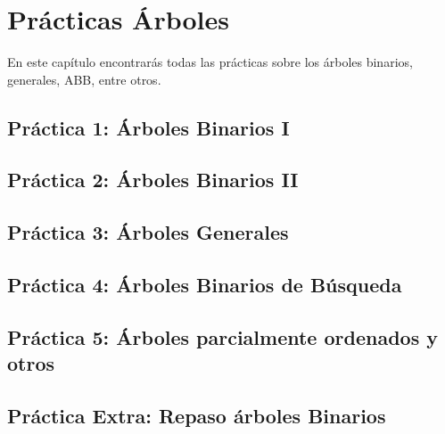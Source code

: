 \chapter{Prácticas Árboles}
En este capítulo encontrarás todas las prácticas sobre los árboles binarios, generales, ABB, entre otros.

\section*{Práctica 1: Árboles Binarios I}
{}
\label{sec:practica1}



\newpage
\section*{Práctica 2: Árboles Binarios II}
{}
\label{sec:practica2}


\newpage
\section*{Práctica 3: Árboles Generales}
{}
\label{sec:practica3}


\newpage
\section*{Práctica 4: Árboles Binarios de Búsqueda}
{}
\label{sec:practica4}


\newpage
\section*{Práctica 5: Árboles parcialmente ordenados y otros}
{}
\label{sec:practica5}



\newpage
\section*{Práctica Extra: Repaso árboles Binarios}
{}
\label{sec:practicaextra}


